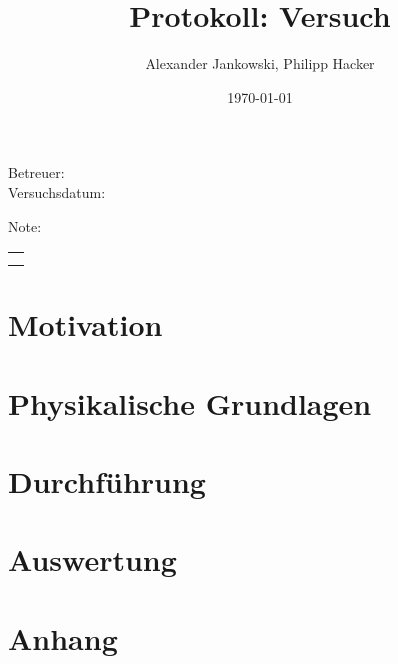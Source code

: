 \documentclass[numbers=noenddot,a4paper,notitlepage,twoside,BCOR15mm]{scrartcl}
\title{Protokoll: Versuch} %
\author{Alexander Jankowski, Philipp Hacker}
\date{\today}
\begin{document}
	\maketitle
	\begin{center}
		Betreuer: \\ %
		Versuchsdatum: \\ %
		\begin{table}[h]
			\centering
			Note: %
			\begin{tabularx}{1.5cm}{|X|}
				\hline \\ \\
				\hline
			\end{tabularx}
		\end{table}
	\end{center}
	\vspace*{\fill}
	\tableofcontents
	\vfill
	\newpage
	\section{Motivation}
	
	\newpage
	\section{Physikalische Grundlagen}
	
	\newpage
	\section{Durchführung}
	
	\newpage
	\section{Auswertung}
	
	\newpage
	\section{Anhang}

		
		
\end{document}
